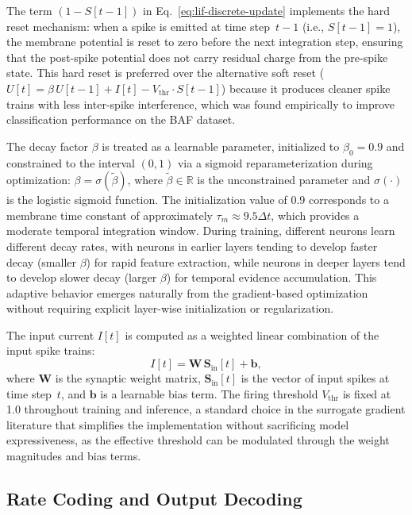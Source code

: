 The term $(1 - S[t-1])$ in Eq.~\eqref{eq:lif-discrete-update} implements the hard reset mechanism: when a spike is emitted at time step~$t-1$ (i.e., $S[t-1] = 1$), the membrane potential is reset to zero before the next integration step, ensuring that the post-spike potential does not carry residual charge from the pre-spike state. This hard reset is preferred over the alternative soft reset ($U[t] = \beta \, U[t-1] + I[t] - V_{\text{thr}} \cdot S[t-1]$) because it produces cleaner spike trains with less inter-spike interference, which was found empirically to improve classification performance on the BAF dataset.

The decay factor $\beta$ is treated as a learnable parameter, initialized to $\beta_0 = 0.9$ and constrained to the interval $(0, 1)$ via a sigmoid reparameterization during optimization: $\beta = \sigma(\tilde{\beta})$, where $\tilde{\beta} \in \mathbb{R}$ is the unconstrained parameter and $\sigma(\cdot)$ is the logistic sigmoid function. The initialization value of 0.9 corresponds to a membrane time constant of approximately $\tau_m \approx 9.5 \Delta t$, which provides a moderate temporal integration window. During training, different neurons learn different decay rates, with neurons in earlier layers tending to develop faster decay (smaller $\beta$) for rapid feature extraction, while neurons in deeper layers tend to develop slower decay (larger $\beta$) for temporal evidence accumulation. This adaptive behavior emerges naturally from the gradient-based optimization without requiring explicit layer-wise initialization or regularization.

The input current $I[t]$ is computed as a weighted linear combination of the input spike trains:
\begin{equation}
I[t] = \mathbf{W} \, \mathbf{S}_{\text{in}}[t] + \mathbf{b},
\label{eq:lif-input-current}
\end{equation}
where $\mathbf{W}$ is the synaptic weight matrix, $\mathbf{S}_{\text{in}}[t]$ is the vector of input spikes at time step~$t$, and $\mathbf{b}$ is a learnable bias term. The firing threshold $V_{\text{thr}}$ is fixed at 1.0 throughout training and inference, a standard choice in the surrogate gradient literature that simplifies the implementation without sacrificing model expressiveness, as the effective threshold can be modulated through the weight magnitudes and bias terms.

\subsection{Rate Coding and Output Decoding}

